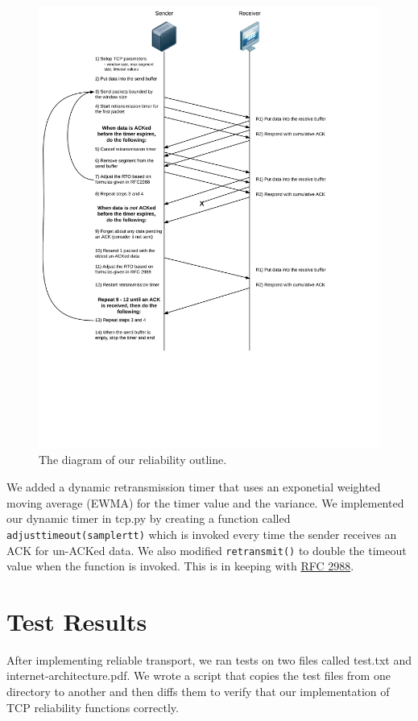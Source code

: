 \documentclass[11pt]{article}
\begin{document}
\begin{figure}[H]
\caption{The diagram of our reliability outline.}
\label{diagram1}
  \centering
  \includegraphics{diagram1}
\end{figure}

We added a dynamic retransmission timer that uses an exponetial weighted moving average (EWMA) for the timer value and the variance. We implemented our dynamic timer in tcp.py by creating a function called \texttt{adjust\textunderscore timeout(sample\textunderscore rtt)} which is invoked every time the sender receives an ACK for un-ACKed data. We also modified \texttt{retransmit()} to double the timeout value when the function is invoked. This is in keeping with \href{http://www.ietf.org/rfc/rfc2988.txt}{RFC 2988}.

\section{Test Results}

After implementing reliable transport, we ran tests on two files called test.txt and internet-architecture.pdf. We wrote a script that copies the test files from one directory to another and then diffs them to verify that our implementation of TCP reliability functions correctly. 
\end{document}
